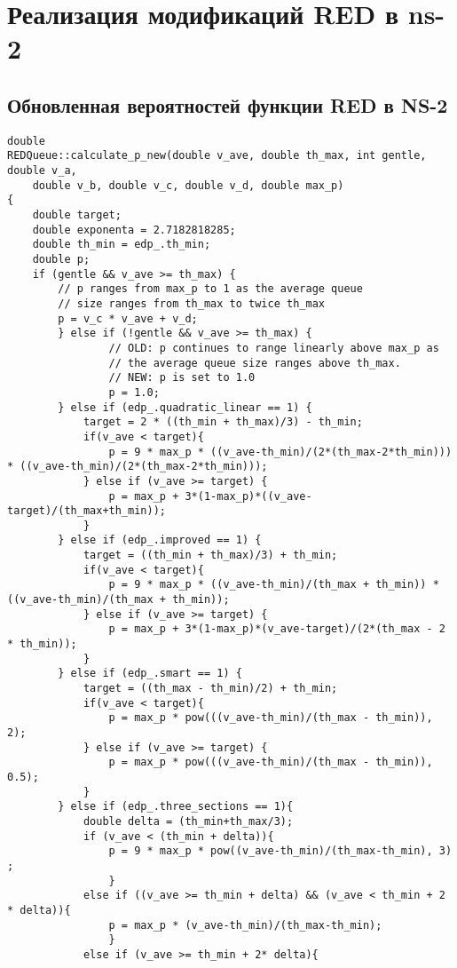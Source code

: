 
\chapter{Реализация модификаций RED в ns-2}
\label{app2}

\section{Обновленная вероятностей функции RED в NS-2}
\label{app2:sec1}
\begin{verbatim}
double
REDQueue::calculate_p_new(double v_ave, double th_max, int gentle, double v_a, 
	double v_b, double v_c, double v_d, double max_p)
{	
	double target;
	double exponenta = 2.7182818285;
	double th_min = edp_.th_min;
	double p;
	if (gentle && v_ave >= th_max) {
		// p ranges from max_p to 1 as the average queue
		// size ranges from th_max to twice th_max 
		p = v_c * v_ave + v_d;
        } else if (!gentle && v_ave >= th_max) { 
                // OLD: p continues to range linearly above max_p as
                // the average queue size ranges above th_max.
                // NEW: p is set to 1.0 
                p = 1.0;
        } else if (edp_.quadratic_linear == 1) {
        	target = 2 * ((th_min + th_max)/3) - th_min;
        	if(v_ave < target){
        		p = 9 * max_p * ((v_ave-th_min)/(2*(th_max-2*th_min))) * ((v_ave-th_min)/(2*(th_max-2*th_min)));
        	} else if (v_ave >= target) {
        		p = max_p + 3*(1-max_p)*((v_ave-target)/(th_max+th_min));
        	}
        } else if (edp_.improved == 1) {
        	target = ((th_min + th_max)/3) + th_min;
        	if(v_ave < target){
        		p = 9 * max_p * ((v_ave-th_min)/(th_max + th_min)) * ((v_ave-th_min)/(th_max + th_min));
        	} else if (v_ave >= target) {
        		p = max_p + 3*(1-max_p)*(v_ave-target)/(2*(th_max - 2 * th_min));
        	}
        } else if (edp_.smart == 1) {
        	target = ((th_max - th_min)/2) + th_min;
        	if(v_ave < target){
        		p = max_p * pow(((v_ave-th_min)/(th_max - th_min)), 2);
        	} else if (v_ave >= target) {
        		p = max_p * pow(((v_ave-th_min)/(th_max - th_min)), 0.5);
        	}
        } else if (edp_.three_sections == 1){
        	double delta = (th_min+th_max/3);
        	if (v_ave < (th_min + delta)){
        		p = 9 * max_p * pow((v_ave-th_min)/(th_max-th_min), 3) ;
        		}
        	else if ((v_ave >= th_min + delta) && (v_ave < th_min + 2 * delta)){
        		p = max_p * (v_ave-th_min)/(th_max-th_min);
        		}
        	else if (v_ave >= th_min + 2* delta){

\end{verbatim}
